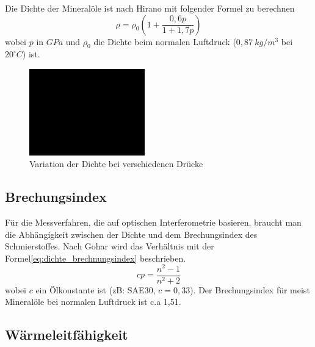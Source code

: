 Die Dichte der Mineralöle ist nach Hirano\cite{hirano} mit folgender Formel zu berechnen
\begin{equation}
    \label{eq:dichte_hirano}
    \rho = \rho_0 \left( 1 + \frac{0,6  p}{1 + 1,7  p} \right)
\end{equation}
%
wobei $p$ in $GPa$ und $\rho_0$ die Dichte beim normalen Luftdruck ($0,87~kg/m^3$ bei $20^\circ C$) ist.
\begin{figure}[htb]
    \centering
    \includegraphics[width=5cm]{./images/blank_img.jpg}
    \caption{Variation der Dichte bei verschiedenen Drücke}
    \label{fig:variation_der_dichte_bei_verschiedenen_druecke}
\end{figure}

\subsection*{Brechungsindex}
\label{sub:brechungsindex}

Für die Messverfahren, die auf optischen Interferometrie basieren, braucht man die Abhängigkeit zwischen der Dichte und dem Brechungsindex des Schmierstoffes.
Nach Gohar wird das Verhältnis mit der Formel\ref{eq:dichte_brechnungsindex} beschrieben.
\begin{equation}
    \label{eq:dichte_brechnungsindex}
    c  p = \frac{n^2 - 1}{n^2 + 2}
\end{equation}
%
wobei $c$ ein Ölkonstante ist (zB: SAE30, $c = 0,33$).
Der Brechungsindex für meist Mineralöle bei normalen Luftdruck ist c.a 1,51.


\subsection*{Wärmeleitfähigkeit}
\label{waermeleitfaehigkeit}

